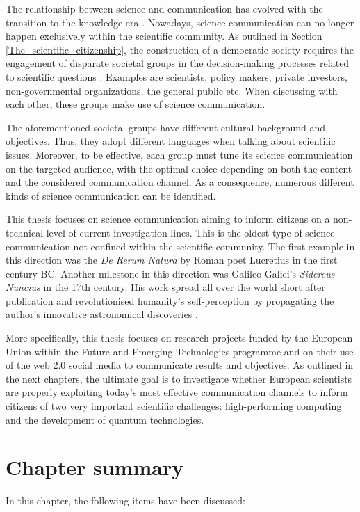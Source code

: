 The relationship between science and communication has evolved with the transition to the knowledge era \cite{Holliman}. Nowadays, science communication can no longer happen exclusively within the scientific community. As outlined in Section \ref{The_scientific_citizenship}, the construction of a democratic society requires the engagement of disparate societal groups in the decision-making processes related to scientific questions \cite{Wynne}. Examples are scientists, policy makers, private investors, non-governmental organizations, the general public etc. When discussing with each other, these groups make use of science communication.

The aforementioned societal groups have different cultural background and objectives. Thus, they adopt different languages when talking about scientific issues. Moreover, to be effective, each group must tune its science communication on the targeted audience, with the optimal choice depending on both the content and the considered communication channel. As a consequence, numerous different kinds of science communication can be identified.   

This thesis focuses on science communication aiming to inform citizens on a non-technical level of current investigation lines. This is the oldest type of science communication not confined within the scientific community. The first example in this direction was the \textit{De Rerum Natura} by Roman poet Lucretius in the first century BC. Another milestone in this direction was Galileo Galiei's \textit{Sidereus Nuncius} in the 17th century. His work spread all over the world short after publication and revolutionised humanity's self-perception by propagating the author's innovative astronomical discoveries \cite{Burke}.

More specifically, this thesis focuses on research projects funded by the European Union within the Future and Emerging Technologies programme and on their use of the web 2.0 social media to communicate results and objectives. As outlined in the next chapters, the ultimate goal is to investigate whether European scientists are properly exploiting today's most effective communication channels to inform citizens of two very important scientific challenges: high-performing computing and the development of quantum technologies.

\section{Chapter summary} 
In this chapter, the following items have been discussed:

